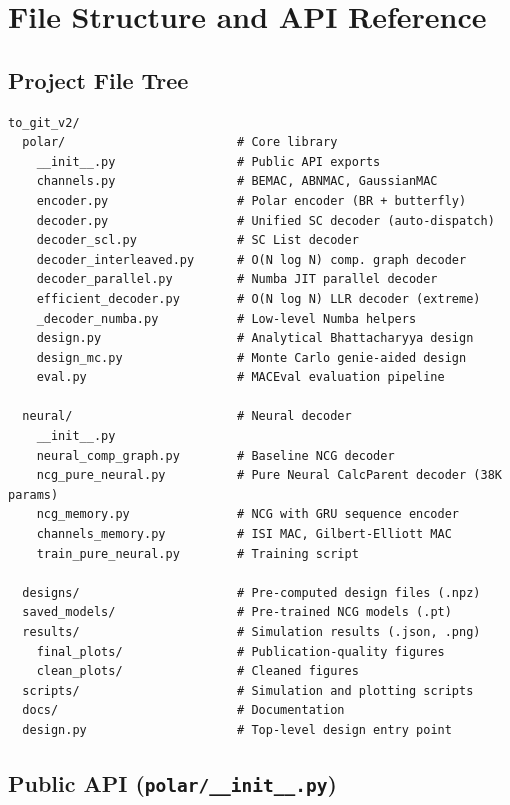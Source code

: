 \documentclass[11pt,a4paper]{article}
\begin{document}
\section{File Structure and API Reference}
\label{sec:filestructure}

\subsection{Project File Tree}

\begin{verbatim}
to_git_v2/
  polar/                        # Core library
    __init__.py                 # Public API exports
    channels.py                 # BEMAC, ABNMAC, GaussianMAC
    encoder.py                  # Polar encoder (BR + butterfly)
    decoder.py                  # Unified SC decoder (auto-dispatch)
    decoder_scl.py              # SC List decoder
    decoder_interleaved.py      # O(N log N) comp. graph decoder
    decoder_parallel.py         # Numba JIT parallel decoder
    efficient_decoder.py        # O(N log N) LLR decoder (extreme)
    _decoder_numba.py           # Low-level Numba helpers
    design.py                   # Analytical Bhattacharyya design
    design_mc.py                # Monte Carlo genie-aided design
    eval.py                     # MACEval evaluation pipeline

  neural/                       # Neural decoder
    __init__.py
    neural_comp_graph.py        # Baseline NCG decoder
    ncg_pure_neural.py          # Pure Neural CalcParent decoder (38K params)
    ncg_memory.py               # NCG with GRU sequence encoder
    channels_memory.py          # ISI MAC, Gilbert-Elliott MAC
    train_pure_neural.py        # Training script

  designs/                      # Pre-computed design files (.npz)
  saved_models/                 # Pre-trained NCG models (.pt)
  results/                      # Simulation results (.json, .png)
    final_plots/                # Publication-quality figures
    clean_plots/                # Cleaned figures
  scripts/                      # Simulation and plotting scripts
  docs/                         # Documentation
  design.py                     # Top-level design entry point
\end{verbatim}

\subsection{Public API (\texttt{polar/\_\_init\_\_.py})}
\end{document}
